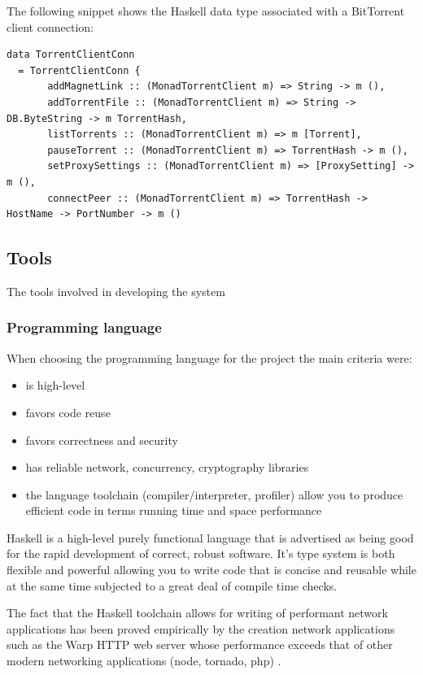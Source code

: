 \documentclass[11pt]{article} %
\begin{document}
The following snippet shows the Haskell  data type associated with a BitTorrent client connection: 

\begin{lstlisting}
data TorrentClientConn
  = TorrentClientConn {
       addMagnetLink :: (MonadTorrentClient m) => String -> m (),
       addTorrentFile :: (MonadTorrentClient m) => String -> DB.ByteString -> m TorrentHash,
       listTorrents :: (MonadTorrentClient m) => m [Torrent],
       pauseTorrent :: (MonadTorrentClient m) => TorrentHash -> m (),
       setProxySettings :: (MonadTorrentClient m) => [ProxySetting] -> m (),
       connectPeer :: (MonadTorrentClient m) => TorrentHash -> HostName -> PortNumber -> m ()
\end{lstlisting}

\subsection{Tools}

The tools involved in developing the system

\subsubsection{Programming language}

When choosing the programming language for the project the main criteria were:

\begin{itemize}
\item is high-level
\item favors code reuse
\item favors correctness and security
\item has reliable network, concurrency, cryptography libraries
\item the language toolchain (compiler/interpreter, profiler) allow you to produce efficient code in terms running time and space performance
\end{itemize}

Haskell is a high-level purely functional language that is advertised as being good for the rapid development of correct, robust software. It's type system is both flexible and powerful allowing you to write code that is concise and reusable while at the same time subjected to a great deal of compile time checks.

The fact that the Haskell toolchain allows for writing of performant network applications has been proved empirically by the creation network applications such as the Warp HTTP web server whose performance exceeds that of other modern networking applications (node, tornado, php) \citep*{web:warpCrossBenchmark}.
\end{document}
